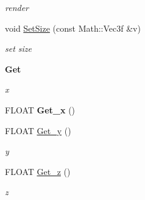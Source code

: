 \begin{DoxyCompactItemize}
\begin{DoxyCompactList}\small\item\em render \item\end{DoxyCompactList}\item 
\hypertarget{classContent_1_1Shape_1_1Admin_1_1Box_af2c35f3a3b4047547a0cc3080dab194e}{
void \hyperlink{classContent_1_1Shape_1_1Admin_1_1Box_af2c35f3a3b4047547a0cc3080dab194e}{SetSize} (const Math::Vec3f \&v)}
\label{classContent_1_1Shape_1_1Admin_1_1Box_af2c35f3a3b4047547a0cc3080dab194e}

\begin{DoxyCompactList}\small\item\em set size \item\end{DoxyCompactList}\end{DoxyCompactItemize}
\begin{Indent}{\bf Get}\par
{\em \label{_amgrpc55582518cba2c464f29f5bae1c68def}
 x }\begin{DoxyCompactItemize}
\item 
\hypertarget{classContent_1_1Shape_1_1Admin_1_1Box_aadacd781061e1c9138b7b36b22c67367}{
FLOAT {\bfseries Get\_\-x} ()}
\label{classContent_1_1Shape_1_1Admin_1_1Box_aadacd781061e1c9138b7b36b22c67367}

\item 
\hypertarget{classContent_1_1Shape_1_1Admin_1_1Box_ae01c4899b31fbd8b7ab591268d1e8261}{
FLOAT \hyperlink{classContent_1_1Shape_1_1Admin_1_1Box_ae01c4899b31fbd8b7ab591268d1e8261}{Get\_\-y} ()}
\label{classContent_1_1Shape_1_1Admin_1_1Box_ae01c4899b31fbd8b7ab591268d1e8261}

\begin{DoxyCompactList}\small\item\em y \item\end{DoxyCompactList}\item 
\hypertarget{classContent_1_1Shape_1_1Admin_1_1Box_ac79f094e2c2277229485ce27ab07e5c2}{
FLOAT \hyperlink{classContent_1_1Shape_1_1Admin_1_1Box_ac79f094e2c2277229485ce27ab07e5c2}{Get\_\-z} ()}
\label{classContent_1_1Shape_1_1Admin_1_1Box_ac79f094e2c2277229485ce27ab07e5c2}

\begin{DoxyCompactList}\small\item\em z \item\end{DoxyCompactList}\end{DoxyCompactItemize}
\end{Indent}
